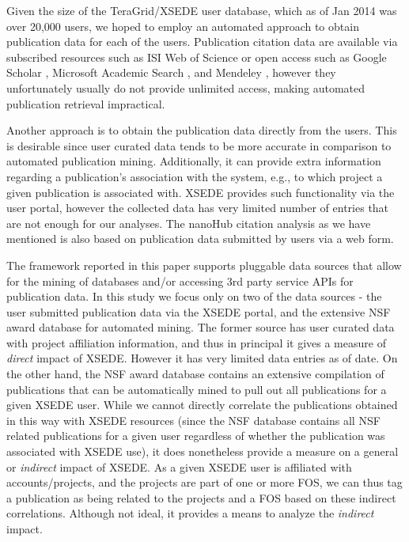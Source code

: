\documentclass{sig-alternate}
\begin{document}
Given the size of the TeraGrid/XSEDE user database, which as of Jan 2014 was over 20,000 users, we hoped to employ an automated approach to obtain publication data for each of the users. Publication citation data are available via subscribed resources such as ISI Web of Science \cite{www-isiwos} or open access such as Google Scholar \cite{www-googlescholar}, Microsoft Academic Search \cite{www-msas}, and Mendeley \cite{www-mendeley}, however they unfortunately usually do not provide unlimited access, making automated publication retrieval impractical.
 
Another approach is to obtain the publication data directly from the users. This is desirable since user curated data tends to be more accurate in comparison to automated publication mining. Additionally, it can provide extra information regarding a publication's association with the system, e.g., to which project a given publication is associated with. XSEDE provides such functionality via the user portal, however the collected data has very limited number of entries that are not enough for our analyses. The nanoHub citation analysis \cite{www-nanohubcite} as we have mentioned is also based on publication data submitted by users via a web form. 
 
The framework reported in this paper supports pluggable data sources that allow for the mining of databases and/or accessing 3rd party service APIs for publication data. In this study we focus only on two of the data sources - the user submitted publication data via the XSEDE portal, and the extensive NSF award database for automated mining. The former source has user curated data with project affiliation information, and thus in principal it gives a measure of \emph{direct} impact of XSEDE. However it has very limited data entries as of date. On the other hand, the NSF award database contains an extensive compilation of publications that can be automatically mined to pull out all publications for a given XSEDE user. While we cannot directly correlate the publications obtained in this way with XSEDE resources (since the NSF database contains all NSF related publications for a given user regardless of whether the publication was associated with XSEDE use), it does nonetheless provide a measure on a general or \emph{indirect} impact of XSEDE. As a given XSEDE user is affiliated with accounts/projects, and the projects are part of one or more FOS, we can thus tag a publication as being related to the projects and a FOS based on these indirect correlations. Although not ideal, it provides a means to analyze the \emph{indirect} impact.
 
\end{document}

